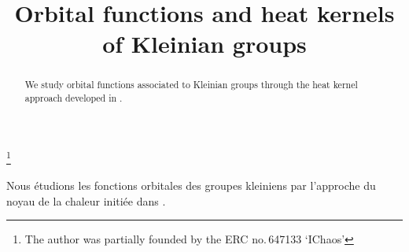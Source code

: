 \documentclass[JEP,XML,SOM,Unicode,NoFloatCountersInSection,published]{cedram}
\theoremstyle{plain}
\theoremstyle{definition}
\begin{document}
\frontmatter

\title{Orbital functions and heat kernels of Kleinian groups}

\author[\initial{A.} \lastname{Boulanger}]{ }
\address{Institut Mathématique de Marseille, CNRS, Aix-Marseille Université\\
39 rue Frédéric Joliot-Curie,
13453 Marseille Cedex 13, France}

\thanks{The author was partially founded by the ERC no.\,647133 `IChaos'}

\begin{abstract}
We study orbital functions associated to Kleinian groups through the heat kernel approach developed in \cite{artmoiheatcounting1}.
\end{abstract}





\begin{altabstract}
Nous étudions les fonctions orbitales des groupes kleiniens par l'approche du noyau de la chaleur initiée dans \cite{artmoiheatcounting1}.
\end{altabstract}

\maketitle
\tableofcontents
\mainmatter
\end{document}

